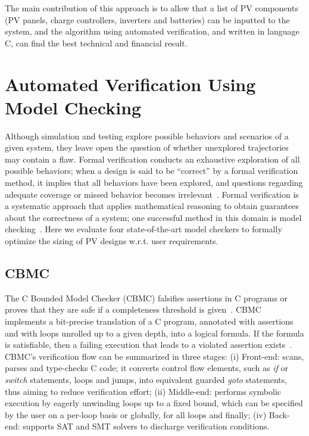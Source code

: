 \documentclass[10pt,conference]{IEEEtran}
\begin{document}
The main contribution of this approach is to allow that a list of PV components (PV panels, charge controllers, inverters and batteries) can be inputted to the system, and the algorithm using automated verification, and written in language C, can find the best technical and financial result.%
\section{Automated Verification Using Model Checking}
\label{sec:AutomatedVerification}
Although simulation and testing explore possible behaviors and scenarios of a given system, they leave open the question of whether unexplored trajectories may contain a flaw. Formal verification conducts an exhaustive exploration of all possible behaviors; when a design is said to be ``correct'' by a formal verification method, it implies that all behaviors have been explored, and questions regarding adequate coverage or missed behavior becomes irrelevant~\cite{Clarke2012}. Formal verification is a systematic approach that applies mathematical reasoning to obtain guarantees about the correctness of a system; one successful method in this domain is model checking~\cite{Clarke2012}. Here we evaluate four state-of-the-art model checkers to formally optimize the sizing of PV designs w.r.t. user requirements.

\subsection{CBMC}
The C Bounded Model Checker (CBMC) falsifies assertions in C programs or proves that they are safe if a completeness threshold is given~\cite{Kroening}. CBMC implements a bit-precise translation of a C program, annotated with assertions and with loops unrolled up to a given depth, into a logical formula. If the formula is satisfiable, then a failing execution that leads to a violated assertion exists~\cite{Kroening}. CBMC's verification flow can be summarized in three stages: (i) Front-end: scans, parses and type-checks C code; it converts control flow elements, such as \textit{if} or \textit{switch} statements, loops and jumps, into equivalent guarded \textit{goto} statements, thus aiming to reduce verification effort; (ii) Middle-end: performs symbolic execution by eagerly unwinding loops up to a fixed bound, which can be specified by the user on a per-loop basis or globally, for all loops and finally; (iv) Back-end: supports SAT and SMT solvers to discharge verification conditions.
\end{document}
